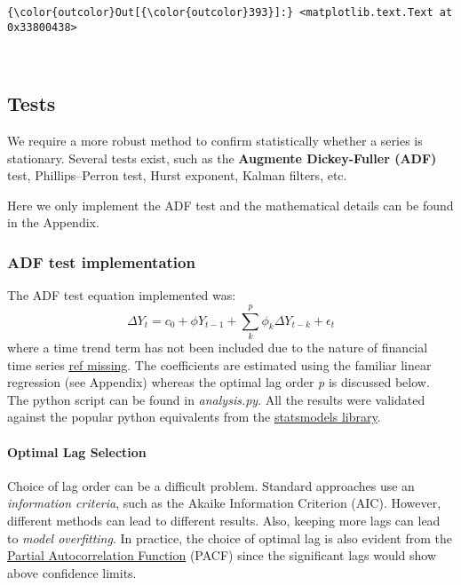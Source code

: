 \documentclass{article}
\begin{document}
            \begin{Verbatim}[commandchars=\\\{\}]
{\color{outcolor}Out[{\color{outcolor}393}]:} <matplotlib.text.Text at 0x33800438>
\end{Verbatim}
        
    \begin{center}
    \end{center}
    { \hspace*{\fill} \\}
    
    \subsection{Tests}\label{tests}

    We require a more robust method to confirm statistically whether a
series is stationary. Several tests exist, such as the \textbf{Augmente
Dickey-Fuller (ADF)} test, Phillips--Perron test, Hurst exponent, Kalman
filters, etc.

Here we only implement the ADF test and the mathematical details can be
found in the Appendix.

    \subsubsection{ADF test implementation}\label{adf-test-implementation}

The ADF test equation implemented was: \[
\Delta Y_t = c_0 + \phi Y_{t-1} + \sum^p_k \phi_k \Delta Y_{t-k} + \epsilon_t 
\] where a time trend term has not been included due to the nature of
financial time series \href{}{ref missing}. The coefficients are
estimated using the familiar linear regression (see Appendix) whereas
the optimal lag order \emph{p} is discussed below. The python script can
be found in \emph{analysis.py}. All the results were validated against
the popular python equivalents from the
\href{http://statsmodels.sourceforge.net/}{statsmodels library}.

    \paragraph{Optimal Lag Selection}\label{optimal-lag-selection}

Choice of lag order can be a difficult problem. Standard approaches use
an \emph{information criteria}, such as the Akaike Information Criterion
(AIC). However, different methods can lead to different results. Also,
keeping more lags can lead to \emph{model overfitting}. In practice, the
choice of optimal lag is also evident from the
\href{http://nl.mathworks.com/help/econ/autocorrelation-and-partial-autocorrelation.html}{Partial
Autocorrelation Function} (PACF) since the significant lags would show
above confidence limits.
\end{document}
